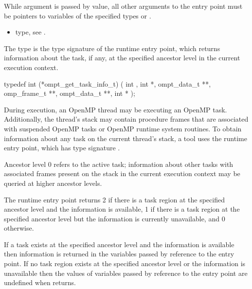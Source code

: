 \constraints
While argument  is passed by value, all other arguments 
to the entry point must be pointers to variables of the specified types or .

\crossreferences
\begin{itemize}
\item {} type, see .
\end{itemize}



\label{sec:ompt_get_task_info_t}
\label{sec:ompt_get_task_info}

\summary
The  type is the type signature of the 
 runtime entry point, which returns information 
about the task, if any, at the specified ancestor level in the current 
execution context.

\format
\begin{ccppspecific}
\begin{omptInquiry}
typedef int (*ompt_get_task_info_t) (
  int ,
  int *,
  ompt_data_t **,
  omp_frame_t **,
  ompt_data_t **,
  int *
);
\end{omptInquiry}
\end{ccppspecific}

\descr
During execution, an OpenMP thread may be executing an OpenMP task.
Additionally, the thread's stack may contain procedure frames that 
are associated with suspended OpenMP tasks or OpenMP runtime system 
routines. To obtain information about any task on the current thread's 
stack, a tool uses the  runtime entry point,
which has type signature .

Ancestor level 0 refers to the active task; information about other 
tasks with associated frames present on the stack in the current execution 
context may be queried at higher ancestor levels.

The  runtime entry point returns 2 if there 
is a task region at the specified ancestor level and the information 
is available, 1 if there is a task region at the specified ancestor 
level but the information is currently unavailable, and 0 otherwise.

If a task exists at the specified ancestor level and the information is 
available then information is returned in the variables passed by reference 
to the entry point. If no task region exists at the specified ancestor level 
or the information is unavailable then the values of variables passed by 
reference to the entry point are undefined when  returns.

